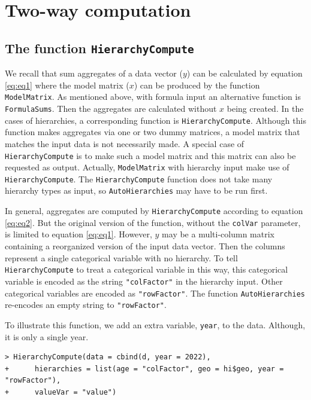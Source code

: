 \hypertarget{two-way-computation}{%
\section{Two-way computation}\label{two-way-computation}}

\hypertarget{the-function-hierarchycompute}{%
\subsection{\texorpdfstring{The function \texttt{HierarchyCompute}}{The function HierarchyCompute}}\label{the-function-hierarchycompute}}

We recall that sum aggregates of a data vector (\(y\)) can be calculated by equation \eqref{eq:eq1} where the model matrix (\(x\)) can be produced by the function \texttt{ModelMatrix}.
As mentioned above, with formula input an alternative function is \texttt{FormulaSums}. Then the aggregates are calculated without \(x\) being created.
In the cases of hierarchies, a corresponding function is \texttt{HierarchyCompute}.
Although this function makes aggregates via one or two dummy matrices, a model matrix that matches the input data is not necessarily made.
A special case of \texttt{HierarchyCompute} is to make such a model matrix and this matrix can also be requested as output.
Actually, \texttt{ModelMatrix} with hierarchy input make use of \texttt{HierarchyCompute}.
The \texttt{HierarchyCompute} function does not take many hierarchy types as input, so \texttt{AutoHierarchies} may have to be run first.

In general, aggregates are computed by \texttt{HierarchyCompute} according to equation \eqref{eq:eq2}.
But the original version of the function, without the \texttt{colVar} parameter, is limited to equation \eqref{eq:eq1}.
However, \(y\) may be a multi-column matrix containing a reorganized version of the input data vector.
Then the columns represent a single categorical variable with no hierarchy.
To tell \texttt{HierarchyCompute} to treat a categorical variable in this way,
this categorical variable is encoded as the string \texttt{"colFactor"} in the hierarchy input.
Other categorical variables are encoded as \texttt{"rowFactor"}.
The function \texttt{AutoHierarchies} re-encodes an empty string to \texttt{"rowFactor"}.

To illustrate this function, we add an extra variable, \texttt{year}, to the data. Although, it is only a single year.

\begin{verbatim}
> HierarchyCompute(data = cbind(d, year = 2022), 
+      hierarchies = list(age = "colFactor", geo = hi$geo, year = "rowFactor"), 
+      valueVar = "value")
\end{verbatim}

